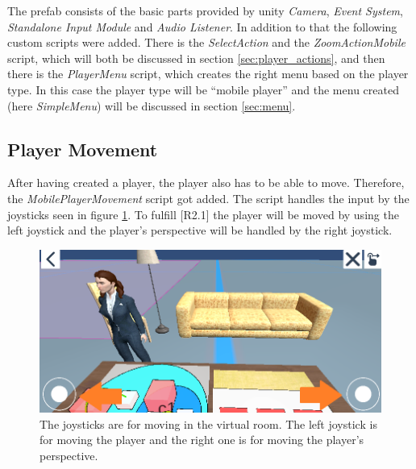 The \gls{prefab} consists of the basic parts provided by \gls{unity} \textit{Camera}, \textit{Event System}, \textit{Standalone Input Module} and \textit{Audio Listener}.
In addition to that the following custom scripts were added.
There is the \textit{SelectAction} and the \textit{ZoomActionMobile} script, which will both be discussed in section \ref{sec:player_actions}, and then there is the \textit{PlayerMenu} script, which creates the right menu based on the player type.
In this case the player type will be \enquote{mobile player} and the menu created (here \textit{SimpleMenu}) will be discussed in section \ref{sec:menu}.

\subsection{Player Movement}
\label{sec:player_movement}
After having created a player, the player also has to be able to move.
Therefore, the \textit{MobilePlayerMovement} script got added.
The script handles the input by the joysticks seen in figure \ref{fig:joystick}.
To fulfill [R2.1] the player will be moved by using the left joystick and the player's perspective will be handled by the right joystick.

\begin{figure}[htb]
    \centering
    \includegraphics[width=1\textwidth]{Implementation/img/joysticks.png}
    \caption{The joysticks are for moving in the virtual room. The left joystick is for moving the player and the right one is for moving the player's perspective.}\label{fig:joystick}
\end{figure}


